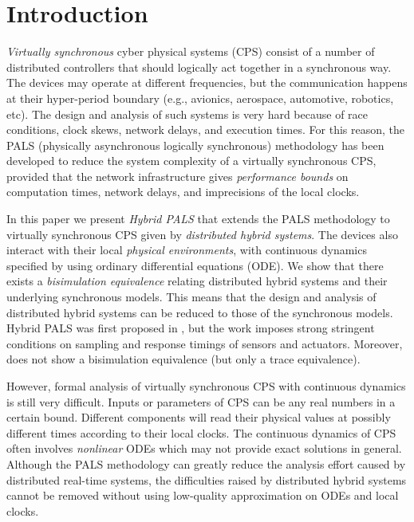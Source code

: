 

\section{Introduction}


\emph{Virtually synchronous} cyber physical systems (CPS)
consist of a number of distributed controllers that should logically act together in a synchronous way. 
The devices may operate at different frequencies, but the communication happens at their hyper-period boundary
(e.g., avionics, aerospace,  automotive, robotics, etc). 
The design and analysis of such systems is very hard because of race conditions, clock skews, network delays, and execution times. %
For this reason, 
the PALS (physically asynchronous logically synchronous) methodology
\cite{pals-rtss09,mr-pals-journal,pals-tcs,al2012pattern} has been
developed to reduce the system complexity of a virtually  synchronous CPS,
provided that the network infrastructure gives \emph{performance bounds}
on computation times, network delays, and imprecisions of the local clocks.

In this paper
we present \emph{Hybrid PALS} that extends the PALS methodology 
to virtually synchronous CPS given by \emph{distributed hybrid systems}.
The devices also interact with their local \emph{physical environments},
with continuous dynamics specified by using ordinary differential equations (ODE).
We show that there exists a \emph{bisimulation equivalence} relating
distributed hybrid systems and their underlying synchronous models.
This means that the design and analysis of distributed hybrid systems
can be reduced to  those of the synchronous models.
%
Hybrid PALS was first proposed in \cite{hybrid-pals}, but 
the work imposes strong stringent conditions on sampling and response timings
of sensors and actuators. Moreover, \cite{hybrid-pals} does not show
a bisimulation equivalence (but only a trace equivalence). %




However, 
formal analysis of virtually synchronous CPS with continuous dynamics is still very difficult.
Inputs or parameters of CPS can be any real numbers in a certain bound.
Different components will read their physical values at possibly different times 
according to their local clocks. 
The continuous dynamics of CPS often involves 
\emph{nonlinear} ODEs
which may not provide exact solutions in general.
Although the 
PALS methodology 
can greatly reduce the analysis effort 
caused by distributed real-time systems,
the difficulties raised by distributed hybrid systems
cannot be removed without using low-quality approximation on ODEs and local clocks.




